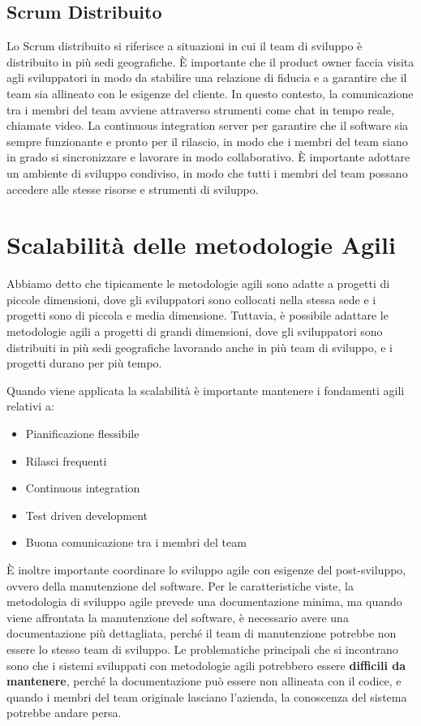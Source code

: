 \subsection{Scrum Distribuito}
Lo Scrum distribuito si riferisce a situazioni in cui il team di sviluppo è distribuito
in più sedi geografiche.
È importante che il product owner faccia visita agli sviluppatori in modo da stabilire 
una relazione di fiducia e a garantire che il team sia allineato con le esigenze del cliente.
In questo contesto, la comunicazione tra i membri del team avviene attraverso strumenti
come chat in tempo reale, chiamate video.
La continuous integration server per garantire che il software sia sempre funzionante 
e pronto per il rilascio, in modo che i membri del team siano in grado si sincronizzare
e lavorare in modo collaborativo.
È importante adottare un ambiente di sviluppo condiviso, in modo che tutti i membri del team
possano accedere alle stesse risorse e strumenti di sviluppo.
\section{Scalabilità delle metodologie Agili}
Abbiamo detto che tipicamente le metodologie agili sono adatte a progetti di piccole
dimensioni, dove gli sviluppatori sono collocati nella stessa sede e i progetti sono 
di piccola e media dimensione. Tuttavia, è possibile adattare le metodologie agili
a progetti di grandi dimensioni, dove gli sviluppatori sono distribuiti in più sedi
geografiche lavorando anche in più team di sviluppo, e i progetti durano per più tempo.

Quando viene applicata la scalabilità è importante mantenere i fondamenti agili relativi a:
\begin{itemize}
    \item Pianificazione flessibile
    \item Rilasci frequenti
    \item Continuous integration
    \item Test driven development
    \item Buona comunicazione tra i membri del team
\end{itemize}
È inoltre importante coordinare lo sviluppo agile con esigenze del post-sviluppo, ovvero 
della manutenzione del software. Per le caratteristiche viste, la metodologia di sviluppo 
agile prevede una documentazione minima, ma quando viene affrontata la manutenzione del
software, è necessario avere una documentazione più dettagliata, perché il team di manutenzione
potrebbe non essere lo stesso team di sviluppo. Le problematiche principali che si incontrano
sono che i sistemi sviluppati con metodologie agili potrebbero essere \textbf{difficili da
mantenere},
perché la documentazione può essere non allineata con il codice, e quando i membri 
del team originale lasciano l'azienda, la conoscenza del sistema potrebbe andare persa.
